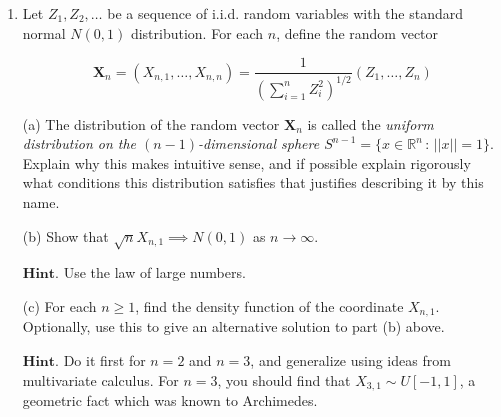 \documentclass[11pt]{report}
\newcommand{\R}{\mathbb{R}}
\theoremstyle{plain}
\theoremstyle{definition}
\begin{document}
\begin{enumerate}[label=\arabic*.]
\[
\mathrm{P}(U \le x\ |\ S_n = k) = \frac{1}{B(k,n-k)} \int_0^x u^k (1-u)^{n-k}\,du, \qquad (0\le x\le 1).
\]

Note: This problem has been whimsically suggested by
Laplace in the 18th century as a way to estimate the
probability that the sun will rise tomorrow, given the
knowledge that it has risen in the last $n$ days. (Of
course, this assumes the unlikely theological scenario
whereby at the dawn of history, a $U(0,1)$ random
number $U$ was drawn, and that subsequently, every
day an independent experiment was performed with
probability $U$ of success, such that if the
experiment is successful then the sun rises.)

$\textbf{Hint.}$ Use the following density version of
the total probability formula: If $A$ is an event and
$X$ is a random variable with density $f_X$, then

\[
\mathrm{P}(A) = \int_{\R} f_X(u) \mathrm{P}(A\ |\ X=u)\,du.
\]

Note that we have not defined what it means to
condition on a 0-probability event (this is a somewhat
delicate subject that we will not discuss in this
quarter) --- but don't worry about it, it is possible
to use the formula in computations anyway and get
results.

\item Let $Z_1,Z_2,\ldots$ be a sequence of i.i.d. random
variables with the standard normal $N(0,1)$
distribution. For each $n$, define the random vector

\[
\mathbf{X}_n = (X_{n,1},\ldots,X_{n,n}) = \frac{1}{\left(\sum_{i=1}^n Z_i^2\right)^{1/2}}
(Z_1,\ldots,Z_n)
\]

(a) The distribution of the random vector
$\mathbf{X}_n$ is called the \emph{uniform distribution on
the $(n-1)$-dimensional sphere
$S^{n-1}=\{ x\in \R^n\,:\, ||x||=1 \}$}. Explain why
this makes intuitive sense, and if possible explain
rigorously what conditions this distribution satisfies
that justifies describing it by this name.

(b) Show that $\sqrt{n} X_{n,1} \implies N(0,1)$ as
$n\to\infty$.

$\textbf{Hint.}$ Use the law of large numbers.

(c) For each $n\ge 1$, find the density function of
the coordinate $X_{n,1}$. Optionally, use this to
give an alternative solution to part (b) above.

$\textbf{Hint.}$ Do it first for $n=2$ and $n=3$, and
generalize using ideas from multivariate calculus. For
$n=3$, you should find that $X_{3,1} \sim U[-1,1]$, a
geometric fact which was known to Archimedes.


\end{enumerate}
\end{document}

